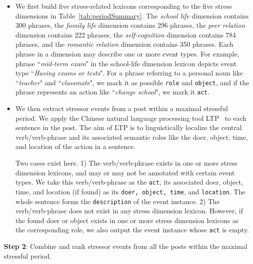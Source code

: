 \begin{itemize}
\item
We first build five stress-related lexicons corresponding to the five stress dimensions in Table~\ref{tab:periodSummary}.
The \emph{school life} dimension contains 300 phrases, the \emph{family life} dimension contains
296 phrases, the \emph{peer relation} dimension contains 222 phrases, the \emph{self-cognition}
dimension contains 784 phrases, and the \emph{romantic relation} dimension contains 350 phrases.
Each phrase in a dimension may describe one or more event types.
For example, phrase ``\emph{mid-term exam}" in the school-life dimension lexicon depicts
event type ``\emph{Having exams or tests}". %
For a phrase referring to a personal noun like ``\emph{teacher}" and ``\emph{classmate}",
we mark it as possible \texttt{role} and \texttt{object}, and if the phrase
represents an action like ``\emph{change school}", we mark it \texttt{act}.

\item
We then extract stressor events from a post within a maximal stressful period.
We apply the Chinese natural language processing tool LTP~\cite{che2008,Che2010} to each sentence in the post.
The aim of LTP is to linguistically localize the central verb/verb-phrase and its associated
semantic roles like the doer, object, time, and location of the action in a sentence.

Two cases exist here. 1) The verb/verb-phrase exists in one or more stress dimension lexicons,
and may or may not be annotated with certain event types.
We take this verb/verb-phrase as the \texttt{act}, its
associated doer, object, time, and location (if found) as its \texttt{doer, object, time},
and \texttt{location}. The whole sentence forms the \texttt{description} of the event instance.
2) The verb/verb-phrase does not exist in any stress dimension lexicon.
However, if the found doer or object exists in one or more stress dimension lexicons as the corresponding role,
we also output the event instance whose \texttt{act} is empty.
\end{itemize}


\textbf{Step 2}: Combine and rank stressor events from all the posts within the maximal stressful period.

